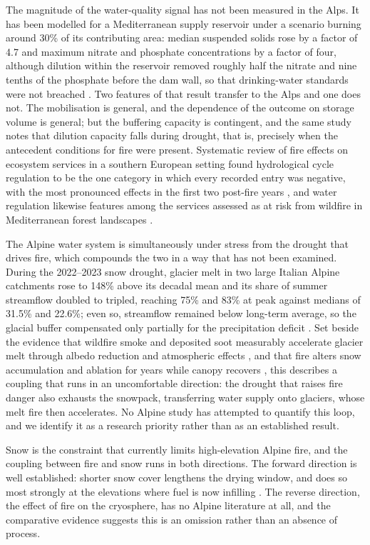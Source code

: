 \documentclass[11pt,a4paper]{article}
\begin{document}
The magnitude of the water-quality signal has not been measured in the Alps. It has been modelled for a Mediterranean supply reservoir under a scenario burning around 30\% of its contributing area: median suspended solids rose by a factor of 4.7 and maximum nitrate and phosphate concentrations by a factor of four, although dilution within the reservoir removed roughly half the nitrate and nine tenths of the phosphate before the dam wall, so that drinking-water standards were not breached \citep{basso_potential_2021}. Two features of that result transfer to the Alps and one does not. The mobilisation is general, and the dependence of the outcome on storage volume is general; but the buffering capacity is contingent, and the same study notes that dilution capacity falls during drought, that is, precisely when the antecedent conditions for fire were present. Systematic review of fire effects on ecosystem services in a southern European setting found hydrological cycle regulation to be the one category in which every recorded entry was negative, with the most pronounced effects in the first two post-fire years \citep{misseyanni_impact_2025}, and water regulation likewise features among the services assessed as at risk from wildfire in Mediterranean forest landscapes \citep{lecinadiaz_assessing_2021}.

The Alpine water system is simultaneously under stress from the drought that drives fire, which compounds the two in a way that has not been examined. During the 2022--2023 snow drought, glacier melt in two large Italian Alpine catchments rose to 148\% above its decadal mean and its share of summer streamflow doubled to tripled, reaching 75\% and 83\% at peak against medians of 31.5\% and 22.6\%; even so, streamflow remained below long-term average, so the glacial buffer compensated only partially for the precipitation deficit \citep{leone_20222023_2026}. Set beside the evidence that wildfire smoke and deposited soot measurably accelerate glacier melt through albedo reduction and atmospheric effects \citep{aubrywake_fire_2022}, and that fire alters snow accumulation and ablation for years while canopy recovers \citep{koshkin_wildfire_2022}, this describes a coupling that runs in an uncomfortable direction: the drought that raises fire danger also exhausts the snowpack, transferring water supply onto glaciers, whose melt fire then accelerates. No Alpine study has attempted to quantify this loop, and we identify it as a research priority rather than as an established result.

Snow is the constraint that currently limits high-elevation Alpine fire, and the coupling between fire and snow runs in both directions. The forward direction is well established: shorter snow cover lengthens the drying window, and does so most strongly at the elevations where fuel is now infilling \citep{rangwala_climate_2012, frei_evidence_2023, pede_mountain_2022}. The reverse direction, the effect of fire on the cryosphere, has no Alpine literature at all, and the comparative evidence suggests this is an omission rather than an absence of process.
\end{document}

